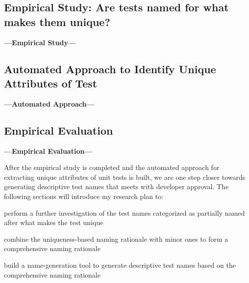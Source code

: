 \subsection{Empirical Study: Are tests named for what makes them unique?}
\label{sec:empStudy}
\textbf{---Empirical Study---}

\subsection{Automated Approach to Identify Unique Attributes of Test}
\label{sec:auto-approach}
\textbf{---Automated Approach---}

\subsection{Empirical Evaluation}
\label{sec:emp-eval}
\textbf{---Empirical Evaluation---}



After the empirical study is completed and the automated approach for extracting unique attributes of unit tests is built, we are one step closer towards generating descriptive test names that meets with developer approval.
%
The following sections will introduce my research plan to:
\begin{enumerate*}
    \item perform a further investigation of the test names categorized as partially named after what makes the test unique
    \item combine the uniqueness-based naming rationale with minor ones to form a comprehensive naming rationale
    \item build a name-generation tool to generate descriptive test names based on the comprehensive naming rationale 
\end{enumerate*}

